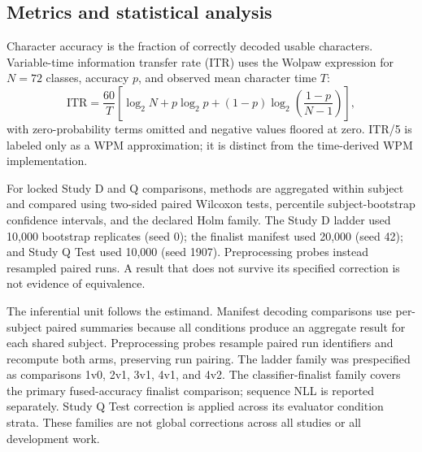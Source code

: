 \documentclass[final,5p,times,twocolumn,authoryear]{elsarticle}
\begin{document}
\subsection{Metrics and statistical analysis}
Character accuracy is the fraction of correctly decoded usable characters. Variable-time information transfer rate (ITR) uses the Wolpaw expression for $N=72$ classes, accuracy $p$, and observed mean character time $T$:
\begin{equation}
\mathrm{ITR}=\frac{60}{T}\left[\log_2N+p\log_2p+(1-p)\log_2\left(\frac{1-p}{N-1}\right)\right],
\label{eq:itr}
\end{equation}
with zero-probability terms omitted and negative values floored at zero. ITR/5 is labeled only as a WPM approximation; it is distinct from the time-derived WPM implementation.

For locked Study D and Q comparisons, methods are aggregated within subject and compared using two-sided paired Wilcoxon tests, percentile subject-bootstrap confidence intervals, and the declared Holm family. The Study D ladder used 10,000 bootstrap replicates (seed 0); the finalist manifest used 20,000 (seed 42); and Study Q Test used 10,000 (seed 1907). Preprocessing probes instead resampled paired runs. A result that does not survive its specified correction is not evidence of equivalence.

The inferential unit follows the estimand. Manifest decoding comparisons use per-subject paired summaries because all conditions produce an aggregate result for each shared subject. Preprocessing probes resample paired run identifiers and recompute both arms, preserving run pairing. The ladder family was prespecified as comparisons 1v0, 2v1, 3v1, 4v1, and 4v2. The classifier-finalist family covers the primary fused-accuracy finalist comparison; sequence NLL is reported separately. Study Q Test correction is applied across its evaluator condition strata. These families are not global corrections across all studies or all development work.
\end{document}
